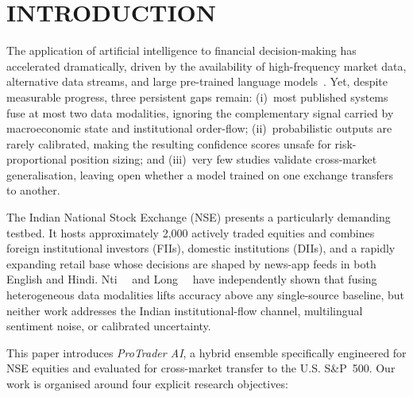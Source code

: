 \section{INTRODUCTION}
\label{sec:intro}

\setlength{\parindent}{5mm}

The application of artificial intelligence to financial decision-making has
accelerated dramatically, driven by the availability of high-frequency market
data, alternative data streams, and large pre-trained language models~\cite{rahmani2023ai}.
Yet, despite measurable progress, three persistent gaps remain: (i)~most
published systems fuse at most two data modalities, ignoring the complementary
signal carried by macroeconomic state and institutional order-flow; (ii)~probabilistic
outputs are rarely calibrated, making the resulting confidence scores unsafe for
risk-proportional position sizing; and (iii)~very few studies validate
cross-market generalisation, leaving open whether a model trained on one exchange
transfers to another.

The Indian National Stock Exchange (NSE) presents a particularly demanding
testbed. It hosts approximately 2{,}000 actively traded equities and combines
foreign institutional investors (FIIs), domestic institutions (DIIs), and a
rapidly expanding retail base whose decisions are shaped by news-app feeds in
both English and Hindi. Nti~\etal~\cite{nti2021multisource} and Long~\etal~\cite{long2024hybrid}
have independently shown that fusing heterogeneous data modalities lifts accuracy
above any single-source baseline, but neither work addresses the Indian
institutional-flow channel, multilingual sentiment noise, or calibrated
uncertainty.

This paper introduces \emph{ProTrader AI}, a hybrid ensemble specifically
engineered for NSE equities and evaluated for cross-market transfer to the U.S.
S\&P~500. Our work is organised around four explicit research objectives:

